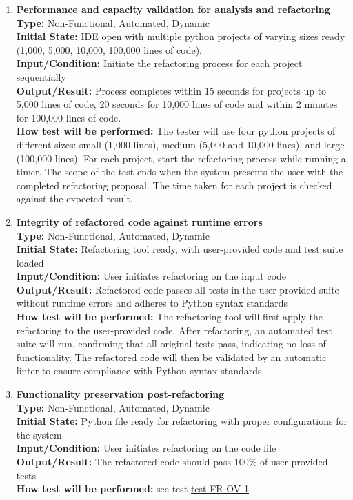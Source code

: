 \documentclass[12pt, titlepage]{article}
\begin{document}
\begin{enumerate}[label={\bf \textcolor{Maroon}{test-PF-\arabic*}}, wide=0pt, font=\itshape]
  \item \textbf{Performance and capacity validation for analysis and refactoring} \\[2mm]
    \textbf{Type:} Non-Functional, Automated, Dynamic \\
    \textbf{Initial State:} IDE open with multiple python projects of varying sizes ready (1,000, 5,000, 10,000, 100,000 lines of code). \\
    \textbf{Input/Condition:} Initiate the refactoring process for each project sequentially \\
    \textbf{Output/Result:} Process completes within 15 seconds for projects up to 5,000 lines of code, 20 seconds for 10,000 lines of code and within 2 minutes for 100,000 lines of code. \\[2mm]
    \textbf{How test will be performed:} The tester will use four python projects of different sizes: small (1,000 lines), medium (5,000 and 10,000 lines), and large (100,000 lines). For each project, start the refactoring process while running a timer. The scope of the test ends when the system presents the user with the completed refactoring proposal. The time taken for each project is checked against the expected result.

  \item \textbf{Integrity of refactored code against runtime errors} \\[2mm]
    \textbf{Type:} Non-Functional, Automated, Dynamic \\
    \textbf{Initial State:} Refactoring tool ready, with user-provided code and test suite loaded \\
    \textbf{Input/Condition:} User initiates refactoring on the input code \\
    \textbf{Output/Result:} Refactored code passes all tests in the user-provided suite without runtime errors and adheres to Python syntax standards \\[2mm]
    \textbf{How test will be performed:} The refactoring tool will first apply the refactoring to the user-provided code. After refactoring, an automated test suite will run, confirming that all original tests pass, indicating no loss of functionality. The refactored code will then be validated by an automatic linter to ensure compliance with Python syntax standards.

  \item \textbf{Functionality preservation post-refactoring} \\[2mm]
    \textbf{Type:} Non-Functional, Automated, Dynamic \\
    \textbf{Initial State:} Python file ready for refactoring with proper configurations for the system \\
    \textbf{Input/Condition:} User initiates refactoring on the code file \\
    \textbf{Output/Result:} The refactored code should pass 100\% of user-provided tests \\[2mm]
    \textbf{How test will be performed:} see test \hyperref[itm:FR-OV-1]{test-FR-OV-1}


\end{enumerate}
\end{document}
